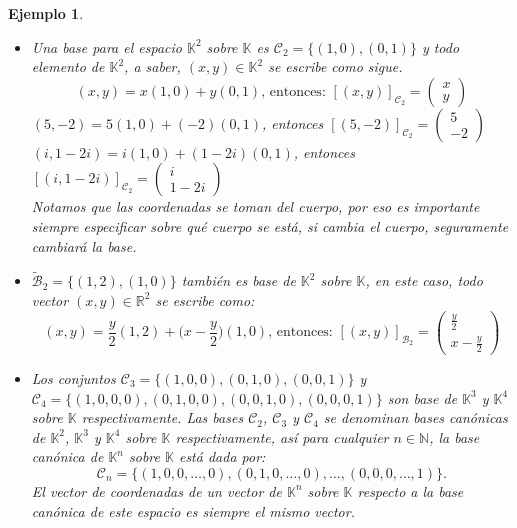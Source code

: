 \documentclass[12pt]{book}
\newtheorem{ejem}{Ejemplo}
\def\R{\mathbb{R}}
\def\N{\mathbb{N}}
\def\C{\mathbb{C}}
\def\K{\mathbb{K}}
\def\B{\mathcal{B}}
\def\Ccal{\mathcal{C}}
\begin{document}
\begin{ejem} {\em
\begin{itemize}
\item Una base para el espacio $\K^2$ sobre $\K$ es $\Ccal_2=\{(1,0),(0,1)\}$ y todo elemento de $\K^2$, a saber, $(x,y)\in\K^2$ se escribe como sigue.
$$(x,y)=x(1,0)+y(0,1)\textrm{, entonces: }[(x,y)]_{\Ccal_2}=\left( \begin{array}{c}x\\y\end{array} \right)  $$
$(5,-2)=5(1,0)+(-2)(0,1)$, entonces $[(5,-2)]_{\Ccal_2}=\left( \begin{array}{c}5\\-2\end{array} \right)$\\
$(i,1-2i)=i(1,0)+(1-2i)(0,1)$, entonces $[(i,1-2i)]_{\Ccal_2}=\left( \begin{array}{c}i\\1-2i\end{array} \right)$\\
Notamos que las coordenadas se toman del cuerpo, por eso es importante siempre especificar sobre qué cuerpo se está, si cambia el cuerpo, seguramente cambiará la base.

\item $\widetilde{\B}_2=\{(1,2),(1,0)\}$ tambi\'en es base de $\K^2$ sobre $\K$, en este caso, todo vector $(x,y)\in\R^2$ se escribe como:
$$(x,y)=\dfrac{y}{2}(1,2)+\Big(x-\dfrac{y}{2}\Big)(1,0)\textrm{, entonces: }[(x,y)]_{\B_2}=\left( \begin{array}{c}\frac{y}{2}\\x-\frac{y}{2}\end{array} \right) $$


\item Los conjuntos $\Ccal_3=\{(1,0,0),(0,1,0),(0,0,1)\}$ y \\
$\Ccal_4=\{(1,0,0,0),(0,1,0,0),(0,0,1,0),(0,0,0,1)\}$ son base de $\K^3$ y $\K^4$ sobre $\K$ respectivamente.
Las bases $\Ccal_2$, $\Ccal_3$ y $\Ccal_4$ se denominan bases can\'onicas de $\K^2$, $\K^3$ y $\K^4$ sobre $\K$ respectivamente, as\'i para cualquier $n\in\N$, la base can\'onica de $\K^n$ sobre $\K$ est\'a dada por:
$$\Ccal_n=\{(1,0,0,\dots,0),(0,1,0,\dots,0),\dots,(0,0,0,\dots,1)\}.$$
El vector de coordenadas de un vector de $\K^n$ sobre $\K$ respecto a la base canónica de este espacio es siempre el mismo vector.
\end{itemize}
}
\end{ejem}
\end{document}

